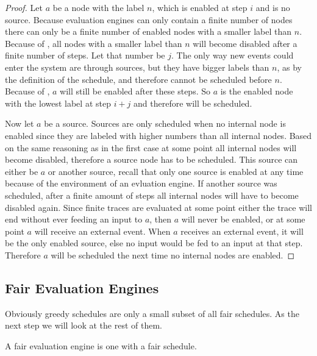 \begin{proof}
  Let \(a\) be a node with the label \(n\), which is enabled at step \(i\) and is no source.
  Because evaluation engines can only contain a finite number of nodes there can only be a finite number of enabled nodes with a smaller label than \(n\).
  Because of , all nodes with a smaller label than \(n\) will become disabled after a finite number of steps.
  Let that number be \(j\).
  The only way new events could enter the system are through sources, but they have bigger labels than \(n\), as by the definition of the schedule, and therefore cannot be scheduled before \(n\).
  Because of , \(a\) will still be enabled after these steps.
  So \(a\) is the enabled node with the lowest label at step \(i + j\) and therefore will be scheduled.

  Now let \(a\) be a source.
  Sources are only scheduled when no internal node is enabled since they are labeled with higher numbers than all internal nodes.
  Based on the same reasoning as in the first case at some point all internal nodes will become disabled, therefore a source node has to be scheduled.
  This source can either be \(a\) or another source, recall that only one source is enabled at any time because of the environment of an evluation engine.
  If another source was scheduled, after a finite amount of steps all internal nodes will have to become disabled again.
  Since finite traces are evaluated at some point either the trace will end without ever feeding an input to \(a\), then \(a\) will never be enabled, or at some point \(a\) will receive an external event.
  When \(a\) receives an external event, it will be the only enabled source, else no input would be fed to an input at that step.
  Therefore \(a\) will be scheduled the next time no internal nodes are enabled.
\end{proof}
\clearpage

\subsection{Fair Evaluation Engines}
\label{sec:behaviours:behaviour_without_timing:fair}

Obviously greedy schedules are only a small subset of all fair schedules.
As the next step we will look at the rest of them.

\begin{definition}[name = Fair Evaluation Engines]\label{def:fair_evaluation_engines}
  A fair evaluation engine is one with a fair schedule.
\end{definition}

